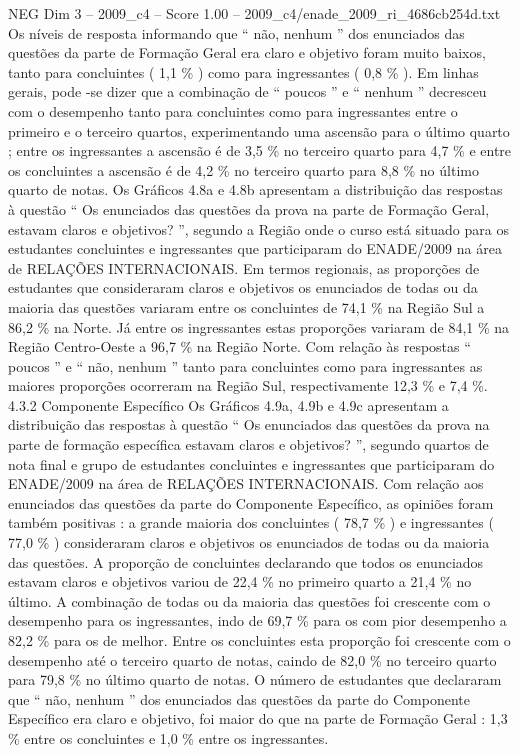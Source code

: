 \begin{textsample}{NEG Dim 3 – 2009\_c4 – Score 1.00 – 2009\_c4/enade\_2009\_ri\_4686cb254d.txt}
Os níveis de resposta informando que “ não, nenhum ” dos enunciados das questões da parte de Formação Geral era claro e objetivo foram muito baixos, tanto para concluintes ( 1,1 \% ) como para ingressantes ( 0,8 \% ).
Em linhas gerais, pode -se dizer que a combinação de “ poucos ” e “ nenhum ” decresceu com o desempenho tanto para concluintes como para ingressantes entre o primeiro e o terceiro quartos, experimentando uma ascensão para o último quarto ; entre os ingressantes a ascensão é de 3,5 \% no terceiro quarto para 4,7 \% e entre os concluintes a ascensão é de 4,2 \% no terceiro quarto para 8,8 \% no último quarto de notas.
Os Gráficos 4.8a e 4.8b apresentam a distribuição das respostas à questão “ Os enunciados das questões da prova na parte de Formação Geral, estavam claros e objetivos? ”, segundo a Região onde o curso está situado para os estudantes concluintes e ingressantes que participaram do ENADE/2009 na área de RELAÇÕES INTERNACIONAIS.
Em termos regionais, as proporções de estudantes que consideraram claros e objetivos os enunciados de todas ou da maioria das questões variaram entre os concluintes de 74,1 \% na Região Sul a 86,2 \% na Norte.
Já entre os ingressantes estas proporções variaram de 84,1 \% na Região Centro-Oeste a 96,7 \% na Região Norte.
Com relação às respostas “ poucos ” e “ não, nenhum ” tanto para concluintes como para ingressantes as maiores proporções ocorreram na Região Sul, respectivamente 12,3 \% e 7,4 \%. 4.3.2 Componente Específico Os Gráficos 4.9a, 4.9b e 4.9c apresentam a distribuição das respostas à questão “ Os enunciados das questões da prova na parte de formação específica estavam claros e objetivos? ”, segundo quartos de nota final e grupo de estudantes concluintes e ingressantes que participaram do ENADE/2009 na área de RELAÇÕES INTERNACIONAIS.
Com relação aos enunciados das questões da parte do Componente Específico, as opiniões foram também positivas : a grande maioria dos concluintes ( 78,7 \% ) e ingressantes ( 77,0 \% ) consideraram claros e objetivos os enunciados de todas ou da maioria das questões.
A proporção de concluintes declarando que todos os enunciados estavam claros e objetivos variou de 22,4 \% no primeiro quarto a 21,4 \% no último.
A combinação de todas ou da maioria das questões foi crescente com o desempenho para os ingressantes, indo de 69,7 \% para os com pior desempenho a 82,2 \% para os de melhor.
Entre os concluintes esta proporção foi crescente com o desempenho até o terceiro quarto de notas, caindo de 82,0 \% no terceiro quarto para 79,8 \% no último quarto de notas.
O número de estudantes que declararam que “ não, nenhum ” dos enunciados das questões da parte do Componente Específico era claro e objetivo, foi maior do que na parte de Formação Geral : 1,3 \% entre os concluintes e 1,0 \% entre os ingressantes.

\end{textsample}
